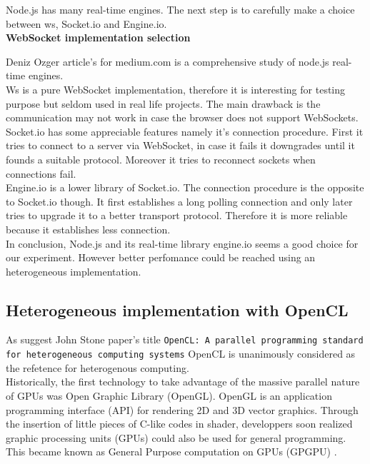 Node.js has many real-time engines. The next step is to carefully make a choice
between ws, Socket.io and Engine.io.\\  

\textbf{WebSocket implementation selection}

Deniz Ozger article's for medium.com \citep{Reference36} is a comprehensive study
of node.js real-time engines.\\

Ws is a pure WebSocket implementation, therefore it is interesting for testing
purpose but seldom used in real life projects.  The main drawback is the
communication may not work in case the browser does not support WebSockets.\\

Socket.io has some appreciable features namely it's connection procedure. First
it tries to connect to a server via WebSocket, in case it fails it downgrades
until it founds a suitable protocol. Moreover it tries to reconnect sockets
when connections fail.\\ 

Engine.io is a lower library of Socket.io. The connection procedure is the
opposite to Socket.io though. It first establishes a long polling connection
and only later tries to upgrade it to a better transport protocol. Therefore it
is more reliable because it establishes less connection.\\

In conclusion, Node.js and its real-time library engine.io seems a good choice
for our experiment. However better perfomance could be reached using an
heterogeneous implementation.


\subsection{Heterogeneous implementation with OpenCL}

As suggest John Stone paper's title \texttt{OpenCL: A parallel programming standard
for heterogeneous computing systems} \citep{Reference5} OpenCL is unanimously
considered as the refetence for heterogenous computing.\\

Historically, the first technology to take advantage of the massive parallel
nature of GPUs was Open Graphic Library (OpenGL). OpenGL is an application
programming interface (API) for rendering 2D and 3D vector graphics. Through
the insertion of little pieces of C-like codes in shader, developpers soon
realized graphic processing units (GPUs) could also be used for general
programming. This became known as General Purpose computation on GPUs (GPGPU)
\citep{Reference5}.\\

